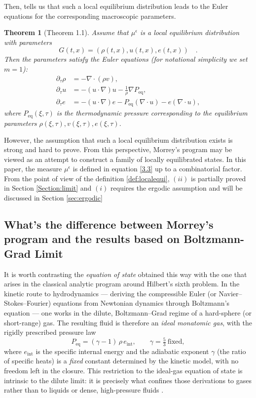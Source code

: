 \documentclass[11pt]{article}
\newtheorem{theorem}{Theorem}
\begin{document}
Then, \cite[Section 0]{DeMasiEtAl1984} tells us that such a local equilibrium distribution leads to the Euler equations for the corresponding macroscopic parameters.

\begin{theorem}[Theorem 1.1]
Assume that $\mu^\epsilon$ is a local equilibrium distribution
with parameters
\[
G(t,x) = (\rho(t,x), u(t,x), e(t,x))
\quad.
\]
Then the parameters satisfy the Euler equations
(for notational simplicity we set $m=1$):
\begin{align}
\partial_\tau \rho&= - \nabla \cdot (\rho v), \tag{1.13a} \\
\partial_\tau u &= - (u \cdot \nabla)u 
- \frac{1}{\rho}\nabla P_{\mathrm{eq}}, \tag{1.13b} \\
\partial_\tau e &= - (u \cdot \nabla)e
- P_{\mathrm{eq}} (\nabla \cdot u)
- e (\nabla \cdot u), \tag{1.13c}
\end{align}
where $P_{\mathrm{eq}}(\xi,\tau)$ is the thermodynamic pressure
corresponding to the equilibrium parameters
$\rho(\xi,\tau), v(\xi,\tau), e(\xi,\tau)$.
\end{theorem}

However, the assumption that such a local equilibrium distribution exists is strong and hard to prove. From this perspective, Morrey’s program may be viewed as an attempt to construct a family of locally equilibrated states. In this paper, the measure $\mu^\epsilon$ is defined in equation \eqref{3.3} up to a combinatorial factor. From the point of view of the definition \ref{def:localequi}, $(ii)$ is partially proved in Section \eqref{Section:limit} and $(i)$ requires the ergodic assumption and will be discussed in Section \ref{sec:ergodic}


\subsection{What's the difference between Morrey's program and the results based on Boltzmann-Grad Limit}
It is worth contrasting the \emph{equation of state} obtained this way with
the one that arises in the classical analytic program around Hilbert's sixth
problem. In the kinetic route to hydrodynamics --- deriving the compressible
Euler (or Navier--Stokes--Fourier) equations from Newtonian dynamics through
Boltzmann's equation \cite{BardosGolseLevermore1991, GallagherSaintRaymondTexier2014,
DengHaniMa2025} --- one works in the dilute, Boltzmann--Grad regime of a
hard-sphere (or short-range) gas. The resulting fluid is therefore an
\emph{ideal monatomic gas}, with the rigidly prescribed pressure law
\[
P_{\mathrm{eq}} = (\gamma-1)\,\rho\, e_{\mathrm{int}},
\qquad \gamma = \tfrac{5}{3}\ \text{fixed},
\]
where $e_{\mathrm{int}}$ is the specific internal energy and the adiabatic
exponent $\gamma$ (the ratio of specific heats) is a \emph{fixed} constant
determined by the kinetic model, with no freedom left in the closure. This
restriction to the ideal-gas equation of state is intrinsic to the dilute
limit: it is precisely what confines those derivations to gases rather than
to liquids or dense, high-pressure fluids \cite{GallagherSaintRaymondTexier2014,
DengHaniMa2025}.
\end{document}
